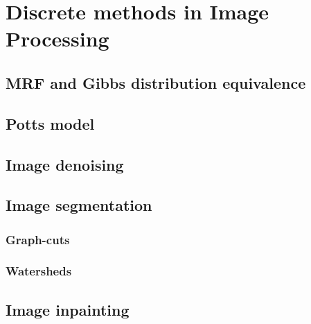\chapter{Discrete methods in Image Processing}
\label{chapter:discrete-methods-in-image-processing}

\section{MRF and Gibbs distribution equivalence}
\section{Potts model}
\section{Image denoising}
\section{Image segmentation}
	\subsection{Graph-cuts}
	\subsection{Watersheds}
\section{Image inpainting}	